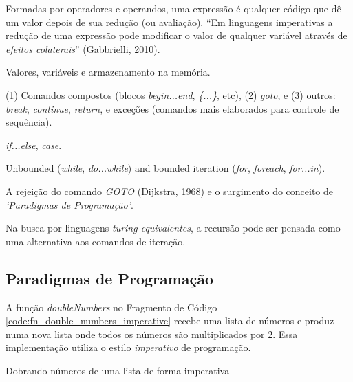 {\tiny
\begin{description}[noitemsep]
\item[Expressões] Formadas por operadores e operandos, uma expressão é qualquer
  código que dê um valor depois de sua redução (ou avaliação). ``Em linguagens
  imperativas a redução de uma expressão pode modificar o valor de qualquer
  variável através de \emph{efeitos colaterais}'' (Gabbrielli, 2010).
\item[Comandos]
  \begin{description}[noitemsep]
  \item[Atribuição] Valores, variáveis e armazenamento na memória.
  \item[Comandos de controle explícito] (1) Comandos compostos (blocos
    \emph{begin...end}, \emph{\{...\}}, etc), (2) \emph{goto}, e (3) outros:
    \emph{break}, \emph{continue}, \emph{return}, e exceções (comandos mais
    elaborados para controle de sequência).
  \item[Comandos Condicionais] \emph{if...else}, \emph{case}.
  \item[Comandos Iterativos] Unbounded (\emph{while}, \emph{do...while}) and
    bounded iteration (\emph{for}, \emph{foreach}, \emph{for...in}).
  \item[Programação Estruturada] A rejeição do comando \emph{GOTO} (Dijkstra,
    1968) e o surgimento do conceito de \emph{‘Paradigmas de Programação’}.
  \item[Recursão] Na busca por linguagens \emph{turing-equivalentes}, a recursão
    pode ser pensada como uma alternativa aos comandos de iteração.
  \end{description}
\end{description}
}

\subsection{Paradigmas de Programação}
\label{sec:prog_paradigms}

A função \emph{doubleNumbers} no Fragmento de Código
\ref{code:fn_double_numbers_imperative} recebe uma lista de números e produz numa nova
lista onde todos os números são multiplicados por 2. Essa implementação utiliza
o estilo \emph{imperativo} de programação.

\begin{listing}[H]
  \centering
  \caption{Dobrando números de uma lista de forma imperativa}
  \inputminted{js}{code/fn_double_numbers_imperative.js}
  \label{code:fn_double_numbers_imperative}
\end{listing}


